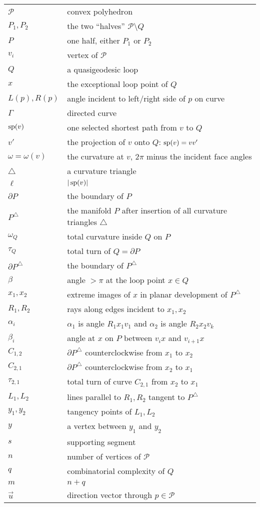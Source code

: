 \pdfoutput=1  \documentclass[]{article}
\def\P{{\mathcal P}}
\def\G{{\Gamma}}
\def\o{{\omega}}
\def\a{{\alpha}}
\def\b{{\beta}}
\def\sp{\mathop{\rm sp}\nolimits}
\def\bP{{\partial P}}
\begin{document}
\begin{tabular}{l l}
$\P$ 
   & convex polyhedron \\
$P_1, P_2$ 
   & the two ``halves'' $\P \setminus Q$ \\
$P$
   & one half, either $P_1$ or $P_2$ \\
$v_i$ 
   & vertex of $\P$ \\
$Q$ 
   & a quasigeodesic loop \\
$x$
   & the exceptional loop point of $Q$ \\
$L(p),R(p)$
   & angle incident to left/right side of $p$ on curve \\
$\G$
   & directed curve \\
$\sp(v)$
   & one selected shortest path from $v$ to $Q$ \\
$v'$
   & the projection of $v$ onto $Q$: $\sp(v) = v v'$ \\
$\o=\o(v)$
   & the curvature at $v$, $2\pi$ minus the incident face angles \\
$\triangle$
   & a curvature triangle \\
$\ell$
   & $|\sp(v)|$ \\
$\bP$
   & the boundary of $P$ \\
$P^\triangle$
   & the manifold $P$ after insertion of all curvature triangles $\triangle$ \\
$\o_Q$
   & total curvature inside $Q$ on $P$ \\
$\tau_Q$
   & total turn of $Q = \bP$ \\
$\bP^\triangle$
   & the boundary of  $P^\triangle$ \\
$\b$
   & angle ${>}\pi$ at the loop point $x \in Q$ \\
$x_1,x_2$
   & extreme images of $x$ in planar development of $P^\triangle$ \\
$R_1,R_2$
   & rays along edges incident to $x_1,x_2$\\
$\a_i$
   & $\a_1$ is angle $R_1 x_1 v_1$ and $\a_2$ is angle $R_2 x_2 v_k$\\
$\b_i$
   & angle at $x$ on $P$ between $v_i x$ and $v_{i+1} x$ \\
$C_{1,2}$
   & $\bP^\triangle$ counterclockwise from $x_1$ to $x_2$ \\
$C_{2,1}$
   & $\bP^\triangle$ counterclockwise from $x_2$ to $x_1$\\
$\tau_{2,1}$
   & total turn of curve $C_{2,1}$ from $x_2$ to $x_1$\\
$L_1,L_2$
   & lines parallel to $R_1,R_2$ tangent to $P^\triangle$\\
$y_1,y_2$
   & tangency points of $L_1,L_2$\\
$y$
   & a vertex between $y_1$ and $y_2$\\
$s$
   & supporting segment\\
$n$
   & number of vertices of $\P$ \\
$q$
   & combinatorial complexity of $Q$\\
$m$
   & $n+q$\\
$\overrightarrow{u}$ 
   & direction vector through $p \in \P$
\end{tabular}







\end{document}
